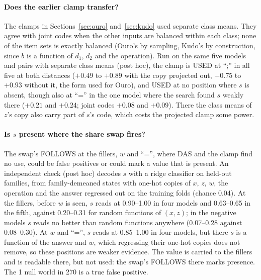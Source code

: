 \documentclass{article}
\begin{document}
\paragraph{Does the earlier clamp transfer?} The clamps in Sections~\ref{sec:ouro} and~\ref{sec:kudo} used separate class means. They agree with joint codes when the other inputs are balanced within each class; none of the item sets is exactly balanced (Ouro's by sampling, Kudo's by construction, since $b$ is a function of $d_1$, $d_2$ and the operation). Run on the same five models and pairs with separate class means (post hoc), the clamp is USED at ``;'' in all five at both distances ($+0.49$ to $+0.89$ with the copy projected out, $+0.75$ to $+0.93$ without it, the form used for Ouro), and USED at no position where $s$ is absent, though also at ``='' in the one model where the search found $s$ weakly there ($+0.21$ and $+0.24$; joint codes $+0.08$ and $+0.09$). There the class means of $z$'s copy also carry part of $s$'s code, which costs the projected clamp some power.

\paragraph{Is $s$ present where the share swap fires?} The swap's FOLLOWS at the fillers, $w$ and ``='', where DAS and the clamp find no use, could be false positives or could mark a value that is present. An independent check (post hoc) decodes $s$ with a ridge classifier on held-out families, from family-demeaned states with one-hot copies of $x$, $z$, $w$, the operation and the answer regressed out on the training folds (chance 0.04). At the fillers, before $w$ is seen, $s$ reads at 0.90--1.00 in four models and 0.63--0.65 in the fifth, against 0.20--0.31 for random functions of $(x, z)$; in the negative models $s$ reads no better than random functions anywhere (0.07--0.28 against 0.08--0.30). At $w$ and ``='', $s$ reads at 0.85--1.00 in four models, but there $s$ is a function of the answer and $w$, which regressing their one-hot copies does not remove, so these positions are weaker evidence. The value is carried to the fillers and is readable there, but not used: the swap's FOLLOWS there marks presence. The 1 null world in 270 is a true false positive.
\end{document}
